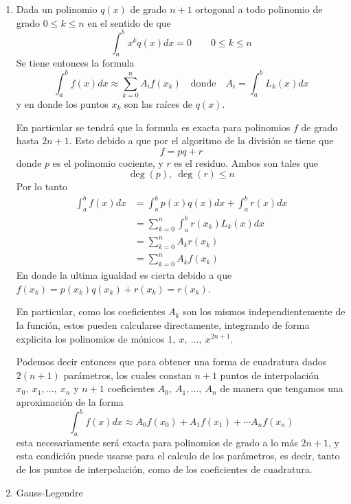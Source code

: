 \begin{problema}\leavevmode
    \begin{enumerate}[label=\textbf{\alph*)}]
        \item Dada un polinomio \(q(x)\) de grado \(n+1\) ortogonal a todo polinomio de grado \(0\le k\le n\) en el sentido de que \[\int_a^b x^kq(x)dx=0\qquad 0\le k\le n\]
        Se tiene entonces la formula \[\int_a^bf(x)dx\approx\sum_{k=0}^nA_if(x_k)\quad\text{donde}\quad A_i=\int_a^bL_k(x)dx\] y en donde los puntos \(x_k\) son las raíces de \(q(x)\).

        En particular se tendrá que la formula es exacta para polinomios \(f\) de grado hasta \(2n+1\). Esto debido a que por el algoritmo de la división se tiene que \[f=pq+r\] donde \(p\) es el polinomio cociente, y \(r\) es el residuo. Ambos son tales que \[\deg(p),\ \deg(r)\le n\] Por lo tanto
        \begin{align*}
            \int_a^bf(x)dx & = \int_a^b p(x)q(x)dx + \int_a^b r(x)dx\\[1em]
                           & = \sum_{k=0}^{n}\int_a^b r(x_k)L_k(x)dx  \\[1em]
                           & = \sum_{k=0}^{n}A_k r(x_k)\\[1em]
                           & = \sum_{k=0}^{n}A_k f(x_k)
        \end{align*}
        En donde la ultima igualdad es cierta debido a que \(f(x_k)=p(x_k)q(x_k)+r(x_k)=r(x_k)\). 

        En particular, como los coeficientes $A_k$ son los mismos independientemente de la función, estos pueden calcularse directamente, integrando de forma explicita los polinomios de mónicos \(1,\ x,\ \ldots,\ x^{2n+1}\). 

        Podemos decir entonces que para obtener una forma de cuadratura dados \(2(n+1)\) parámetros, los cuales constan \(n+1\) puntos de interpolación \(x_0,\ x_1, \ldots,\ x_n\) y \(n+1\) coeficientes \(A_0,\ A_1, \ldots,\ A_n\) de manera que tengamos una aproximación de la forma \[\int_a^bf(x)dx\approx A_0f(x_0)+A_1f(x_1)+\cdots A_nf(x_n)\]
        esta necesariamente será exacta para polinomios de grado a lo más \(2n+1\), y esta condición puede usarse para el calculo de los parámetros, es decir, tanto de los puntos de interpolación, como de los coeficientes de cuadratura. 

        \item Gauss-Legendre
        

    \end{enumerate}
\end{problema}